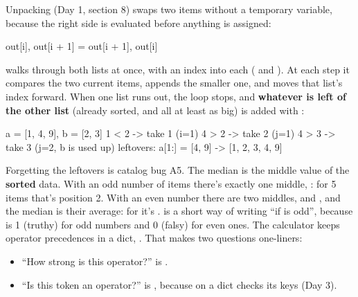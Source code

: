 \documentclass[10pt,a4paper]{article}
\begin{document}
Unpacking (Day 1, section 8) swaps two items without a temporary variable, because the right side is evaluated before anything is assigned:
\begin{pycode}
out[i], out[i + 1] = out[i + 1], out[i]
\end{pycode}
 walks through both lists at once, with an index into each ( and ). At each step it compares the two current items, appends the smaller one, and moves that list’s index forward. When one list runs out, the loop stops, and \textbf{whatever is left of the other list} (already sorted, and all at least as big) is added with :
\begin{txtcode}
a = [1, 4, 9], b = [2, 3]
1 < 2 -> take 1 (i=1)     4 > 2 -> take 2 (j=1)     4 > 3 -> take 3 (j=2, b is used up)
leftovers: a[1:] = [4, 9]  ->  [1, 2, 3, 4, 9]
\end{txtcode}
Forgetting the leftovers is catalog bug A5.
The median is the middle value of the \textbf{sorted} data. With an odd number of items there’s exactly one middle, : for 5 items that’s position 2. With an even number there are two middles,  and , and the median is their average: for  it’s .  is a short way of writing “if  is odd”, because  is 1 (truthy) for odd numbers and 0 (falsy) for even ones.
The calculator keeps operator precedences in a dict, . That makes two questions one-liners:
\begin{itemize}
\item “How strong is this operator?” is .
\item “Is this token an operator?” is , because  on a dict checks its keys (Day 3).
\end{itemize}
\end{document}
